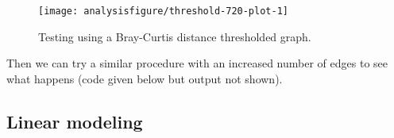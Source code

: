 \begin{figure}[H]
\begin{knitrout}
\color{fgcolor}\begin{kframe}
\begin{alltt}
\hlkwb{=}  \hlopt{+} \hlstd{(} \hlstd{=} \hlstd{(} \hlstd{=} \hlstd{),}
         \hlstd{=} \hlstd{(} \hlstd{=} \hlstd{))}
\hlkwb{=}
\hlstd{(} \hlstd{=} 
\end{alltt}
\end{kframe}

{\centering \texttt{[image: analysisfigure/threshold-720-plot-1]} 

}



\end{knitrout}
\caption{Testing using a Bray-Curtis distance thresholded graph.}
\label{fig:threshold-720-plot}
\end{figure}

Then we can try a similar procedure with an increased number of edges
to see what happens (code given below but output not shown).

\begin{knitrout}
\color{fgcolor}\begin{kframe}
\begin{alltt}
 \hlkwb{<-}  \hlstd{,}  \hlstd{=} \hlstd{,}
                       \hlstd{=} \hlstd{,}  \hlstd{=} \hlstd{,}  \hlstd{=} \hlstd{,}
                       \hlstd{=} \hlstd{)}
\end{alltt}
\end{kframe}
\end{knitrout}




\subsection*{Linear modeling}

